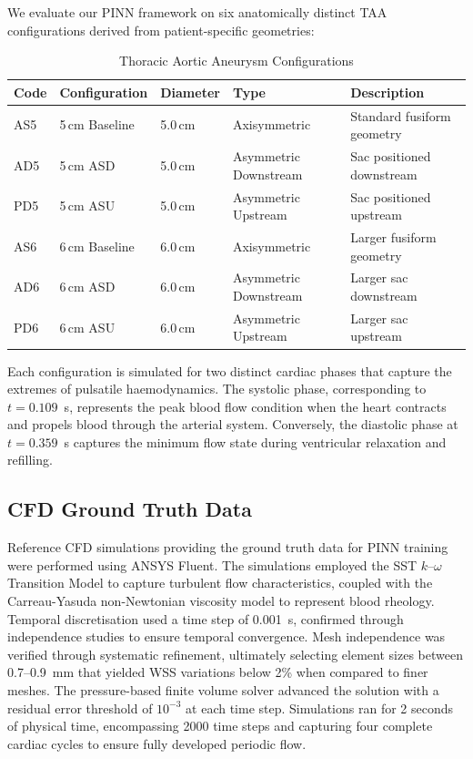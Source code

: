 \documentclass[11pt,a4paper]{article}
\begin{document}
We evaluate our PINN framework on six anatomically distinct TAA configurations derived from patient-specific geometries:

\begin{table}[H]
\centering
\caption{Thoracic Aortic Aneurysm Configurations}
\label{tab:configurations}
\begin{tabular}{lllll}
\toprule
\textbf{Code} & \textbf{Configuration} & \textbf{Diameter} & \textbf{Type} & \textbf{Description} \\
\midrule
AS5 & 5\,cm Baseline & 5.0\,cm & Axisymmetric & Standard fusiform geometry \\
AD5 & 5\,cm ASD & 5.0\,cm & Asymmetric Downstream & Sac positioned downstream \\
PD5 & 5\,cm ASU & 5.0\,cm & Asymmetric Upstream & Sac positioned upstream \\
AS6 & 6\,cm Baseline & 6.0\,cm & Axisymmetric & Larger fusiform geometry \\
AD6 & 6\,cm ASD & 6.0\,cm & Asymmetric Downstream & Larger sac downstream \\
PD6 & 6\,cm ASU & 6.0\,cm & Asymmetric Upstream & Larger sac upstream \\
\bottomrule
\end{tabular}
\end{table}

Each configuration is simulated for two distinct cardiac phases that capture the extremes of pulsatile haemodynamics. The systolic phase, corresponding to $t = 0.109$~s, represents the peak blood flow condition when the heart contracts and propels blood through the arterial system. Conversely, the diastolic phase at $t = 0.359$~s captures the minimum flow state during ventricular relaxation and refilling.

\subsection{CFD Ground Truth Data}

Reference CFD simulations providing the ground truth data for PINN training were performed using ANSYS Fluent. The simulations employed the SST $k$--$\omega$ Transition Model to capture turbulent flow characteristics, coupled with the Carreau-Yasuda non-Newtonian viscosity model to represent blood rheology. Temporal discretisation used a time step of 0.001~s, confirmed through independence studies to ensure temporal convergence. Mesh independence was verified through systematic refinement, ultimately selecting element sizes between 0.7--0.9~mm that yielded WSS variations below 2\% when compared to finer meshes. The pressure-based finite volume solver advanced the solution with a residual error threshold of $10^{-3}$ at each time step. Simulations ran for 2 seconds of physical time, encompassing 2000 time steps and capturing four complete cardiac cycles to ensure fully developed periodic flow.
\end{document}

